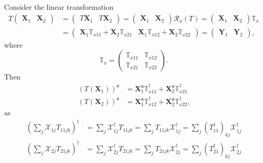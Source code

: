 \documentclass[aps, preprint]{revtex4}
\begin{document}
Consider the linear transformation
\begin{align}T \left (\begin{array}{cc}\mathbf{X}_{1} & \mathbf{X}_{2}\end{array}\right ) &  =\left (\begin{array}{cc}T \mathbf{X}_{1} & T \mathbf{X}_{2}\end{array}\right ) =\left (\begin{array}{cc}\mathbf{X}_{1} & \mathbf{X}_{2}\end{array}\right ) \mathcal{R}_{x} \left (T\right ) =\left (\begin{array}{cc}\mathbf{X}_{1} & \mathbf{X}_{2}\end{array}\right ) \mathbb{T}_{x} \\
 &  =\left (\begin{array}{cc}\mathbf{X}_{1} \mathbb{T}_{x 1 1} +\mathbf{X}_{2} \mathbb{T}_{x 2 1} & \mathbf{X}_{1} \mathbb{T}_{x 1 2} +\mathbf{X}_{2} \mathbb{T}_{x 2 2}\end{array}\right ) =\left (\begin{array}{cc}\mathbf{Y}_{1} & \mathbf{Y}_{2}\end{array}\right )\text{,}\end{align}where
\begin{equation}\mathbb{T}_{x} =\left (\begin{array}{cc}\mathbb{T}_{x 1 1} & \mathbb{T}_{x 1 2} \\
\mathbb{T}_{x 2 1} & \mathbb{T}_{x 2 2}\end{array}\right )\text{.}
\end{equation}Then
\begin{align}\left (T \left (\mathbf{X}_{1}\right )\right )^{\mathfrak{a}} &  =\mathbf{X}_{1}^{\mathfrak{a}} \mathbb{T}_{x 1 1}^{ \dag } +\mathbf{X}_{2}^{\mathfrak{a}} \mathbb{T}_{x 2 1}^{ \dag } \\
\left (T \left (\mathbf{X}_{2}\right )\right )^{\mathfrak{a}} &  =\mathbf{X}_{1}^{\mathfrak{a}} \mathbb{T}_{x 1 2}^{ \dag } +\mathbf{X}_{2}^{\mathfrak{a}} \mathbb{T}_{x 2 2}^{ \dag }\text{,}\end{align}as
\begin{align}\left (\sum _{j}\mathcal{X}_{1 j} T_{1 1 j k}\right )^{ \dag } &  =\sum _{j}\mathcal{X}_{1 j}^{ \dag } T_{1 1 j k} =\sum _{j}T_{1 1 j k} \mathcal{X}_{1 j}^{ \dag } =\sum _{j}\left (T_{1 1}^{ \dag }\right )_{k j} \mathcal{X}_{1 j}^{ \dag } \\
\left (\sum _{j}\mathcal{X}_{2 j} T_{2 1 j k}\right )^{ \dag } &  =\sum _{j}\mathcal{X}_{2 j}^{ \dag } T_{2 1 j k} =\sum _{j}T_{2 1 j k} \mathcal{X}_{2 j}^{ \dag } =\sum _{j}\left (T_{2 1}^{ \dag }\right )_{k j} \mathcal{X}_{2 j}^{ \dag }\end{align}
\end{document}
